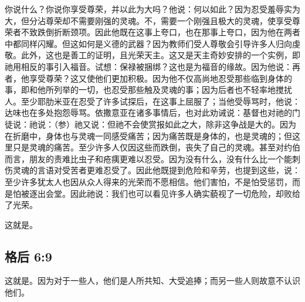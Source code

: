 你说什么？你说你享受尊荣，并以此为大吗？他说：何以如此？因为忍受羞辱实为大，但分沾尊荣却不需要刚强的灵魂。不，需要一个刚强且极大的灵魂，使享受尊荣者不致跌倒折断颈项。因此他既在这事上夸口，也在那事上夸口，因为他在两者中都同样闪耀。但这如何是义德的武器？因为教师们受人尊敬会引导许多人归向虔敬。此外，这也是善工的证明，且光荣天主。这又是天主奇妙安排的一个实例，即祂用相反的事引入福音。试想：保禄被捆绑？这也是为福音的缘故。因为他说：再者，他享受尊荣？这又使他们更加积极。因为他不仅高尚地忍受那些临到身体的事，即和他所列举的一切，也忍受那些触及灵魂的事；因为后者也不轻率地搅扰人。至少耶肋米亚在忍受了许多试探后，在这事上屈服了；当他受辱骂时，他说：达味也在多处抱怨辱骂。依撒意亚在诸多事情后，也对此劝诫说：基督也对祂的门徒说：祂说：（参）祂又说：但祂不会使赏报如此之大，除非这争战是大的。因为在折磨中，身体也与灵魂一同感受痛苦；因为痛苦既是身体的，也是灵魂的；但这里只是灵魂的痛苦。至少许多人仅因这些而跌倒，丧失了自己的灵魂。甚至对约伯而言，朋友的责难比虫子和疮痍更难以忍受。因为没有什么，没有什么比一个能刺伤灵魂的言语对受苦者更难忍受了。因此他既提到危险和辛劳，也提到这些，说：至少许多犹太人也因从众人得来的光荣而不愿相信。他们害怕，不是怕受惩罚，而是怕被逐出会堂。因此祂说：我们也可以看见许多人确实藐视了一切危险，却败给了光荣。\par

\par

这就是。\par


\subsection{格后 6:9}

这就是。因为对于一些人，他们是人所共知、大受追捧；而另一些人则故意不认识他们。\par

